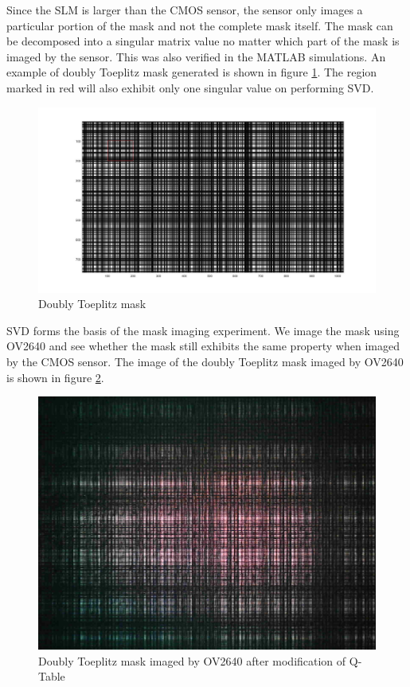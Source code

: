  Since the SLM is larger than the CMOS sensor, the sensor only images a particular portion of the mask and not the complete mask itself.
The mask can be decomposed into a singular matrix value no matter which part of the mask is imaged by the sensor. This was also verified in the MATLAB simulations. An example of doubly Toeplitz mask generated is shown in figure \ref{fig:doubly_toepl_custom}. The region marked in red will also exhibit only one singular value on performing SVD.
\begin{figure}[h]
\centering
\includegraphics[scale=0.20]{pics/slm/mask_sub_prop.jpg}
\caption{Doubly Toeplitz mask}
\label{fig:doubly_toepl_custom}
\end{figure}
SVD forms the basis of the mask imaging experiment. We image the mask using OV2640 and see whether the mask still exhibits the same property when imaged by the CMOS sensor. The image of the doubly Toeplitz mask imaged by OV2640 is shown in figure \ref{fig:dt_ov2640}.
\begin{figure}[h]
\centering
\includegraphics[scale=0.20]{pics/slm/ov2640dtmask.jpg}
\caption{Doubly Toeplitz mask imaged by OV2640 after modification of Q-Table}
\label{fig:dt_ov2640}
\end{figure}
